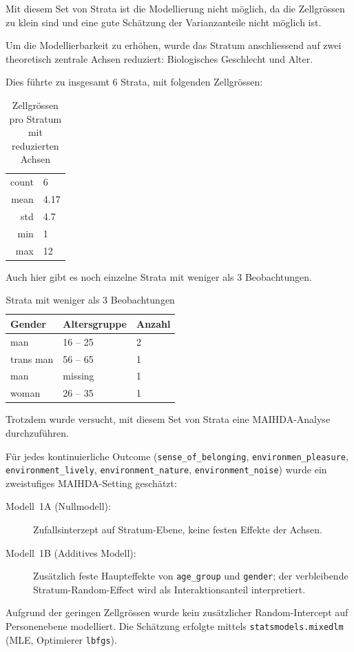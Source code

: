 Mit diesem Set von Strata ist die Modellierung nicht möglich, da die Zellgrössen zu klein sind und eine gute Schätzung der Varianzanteile nicht möglich ist.

Um die Modellierbarkeit zu erhöhen, wurde das Stratum anschliessend auf zwei theoretisch zentrale Achsen reduziert: Biologisches Geschlecht und Alter.

Dies führte zu insgesamt $6$ Strata, mit folgenden Zellgrössen:

\begin{table}[h]
    \centering
    \begin{tabular}{rl}
        count & 6 \\
        mean & 4.17 \\
        std & 4.7 \\
        min & 1 \\
        max & 12 \\
    \end{tabular}
    \caption{Zellgrössen pro Stratum mit reduzierten Achsen}
    \label{tab:zellgroessen_reduzierte_achsen}
\end{table}

Auch hier gibt es noch einzelne Strata mit weniger als 3 Beobachtungen.

\begin{table}[h]
    \centering
    \begin{tabular}{lll}
        Gender & Altersgruppe & Anzahl \\
        \hline
        man & 16 -- 25 & 2 \\
        trans man & 56 -- 65 & 1 \\
        man & missing & 1 \\
        woman & 26 -- 35 & 1 \\
    \end{tabular}
    \caption{Strata mit weniger als 3 Beobachtungen}
    \label{tab:zellgroessen_reduzierte_achsen_kleine_strata}
\end{table}

Trotzdem wurde versucht, mit diesem Set von Strata eine MAIHDA-Analyse durchzuführen.

Für jedes kontinuierliche Outcome (\texttt{sense\_of\_belonging}, \texttt{environmen\_pleasure}, \texttt{environment\_lively}, \texttt{environment\_nature}, \texttt{environment\_noise}) wurde ein zweistufiges MAIHDA-Setting geschätzt:
\begin{description}
    \item[Modell~1A (Nullmodell):] Zufallsinterzept auf Stratum-Ebene, keine festen Effekte der Achsen.
    \item[Modell~1B (Additives Modell):] Zusätzlich feste Haupteffekte von \texttt{age\_group} und \texttt{gender}; der verbleibende Stratum-Random-Effect wird als Interaktionsanteil interpretiert.
\end{description}
Aufgrund der geringen Zellgrössen wurde kein zusätzlicher Random-Intercept auf Personenebene modelliert. Die Schätzung erfolgte mittels \texttt{statsmodels.mixedlm} (MLE, Optimierer \texttt{lbfgs}).


